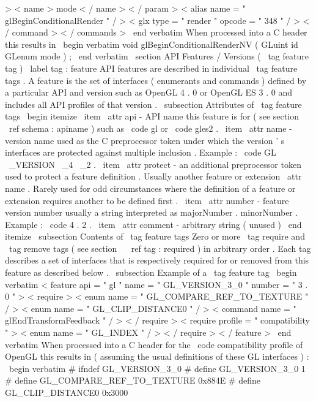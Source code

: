 >
<
name
>
mode
<
/
name
>
<
/
param
>
<
alias
name
=
"
glBeginConditionalRender
"
/
>
<
glx
type
=
"
render
"
opcode
=
"
348
"
/
>
<
/
command
>
<
/
commands
>
\
end
{
verbatim
}
When
processed
into
a
C
header
this
results
in
\
begin
{
verbatim
}
void
glBeginConditionalRenderNV
(
GLuint
id
GLenum
mode
)
;
\
end
{
verbatim
}
\
section
{
API
Features
/
Versions
(
\
tag
{
feature
}
tag
)
}
\
label
{
tag
:
feature
}
API
features
are
described
in
individual
\
tag
{
feature
}
tags
.
A
feature
is
the
set
of
interfaces
(
enumerants
and
commands
)
defined
by
a
particular
API
and
version
such
as
OpenGL
4
.
0
or
OpenGL
ES
3
.
0
and
includes
all
API
profiles
of
that
version
.
\
subsection
{
Attributes
of
\
tag
{
feature
}
tags
}
\
begin
{
itemize
}
\
item
\
attr
{
api
}
-
API
name
this
feature
is
for
(
see
section
~
\
ref
{
schema
:
apiname
}
)
such
as
\
code
{
gl
}
or
\
code
{
gles2
}
.
\
item
\
attr
{
name
}
-
version
name
used
as
the
C
preprocessor
token
under
which
the
version
'
s
interfaces
are
protected
against
multiple
inclusion
.
Example
:
\
code
{
GL
\
_VERSION
\
_4
\
_2
}
.
\
item
\
attr
{
protect
}
-
an
additional
preprocessor
token
used
to
protect
a
feature
definition
.
Usually
another
feature
or
extension
\
attr
{
name
}
.
Rarely
used
for
odd
circumstances
where
the
definition
of
a
feature
or
extension
requires
another
to
be
defined
first
.
\
item
\
attr
{
number
}
-
feature
version
number
usually
a
string
interpreted
as
majorNumber
.
minorNumber
.
Example
:
\
code
{
4
.
2
}
.
\
item
\
attr
{
comment
}
-
arbitrary
string
(
unused
)
\
end
{
itemize
}
\
subsection
{
Contents
of
\
tag
{
feature
}
tags
}
Zero
or
more
\
tag
{
require
}
and
\
tag
{
remove
}
tags
(
see
section
~
\
ref
{
tag
:
required
}
)
in
arbitrary
order
.
Each
tag
describes
a
set
of
interfaces
that
is
respectively
required
for
or
removed
from
this
feature
as
described
below
.
\
subsection
{
Example
of
a
\
tag
{
feature
}
tag
}
\
begin
{
verbatim
}
<
feature
api
=
"
gl
"
name
=
"
GL_VERSION_3_0
"
number
=
"
3
.
0
"
>
<
require
>
<
enum
name
=
"
GL_COMPARE_REF_TO_TEXTURE
"
/
>
<
enum
name
=
"
GL_CLIP_DISTANCE0
"
/
>
<
command
name
=
"
glEndTransformFeedback
"
/
>
<
/
require
>
<
require
profile
=
"
compatibility
"
>
<
enum
name
=
"
GL_INDEX
"
/
>
<
/
require
>
<
/
feature
>
\
end
{
verbatim
}
When
processed
into
a
C
header
for
the
\
code
{
compatibility
}
profile
of
OpenGL
this
results
in
(
assuming
the
usual
definitions
of
these
GL
interfaces
)
:
\
begin
{
verbatim
}
#
ifndef
GL_VERSION_3_0
#
define
GL_VERSION_3_0
1
#
define
GL_COMPARE_REF_TO_TEXTURE
0x884E
#
define
GL_CLIP_DISTANCE0
0x3000
